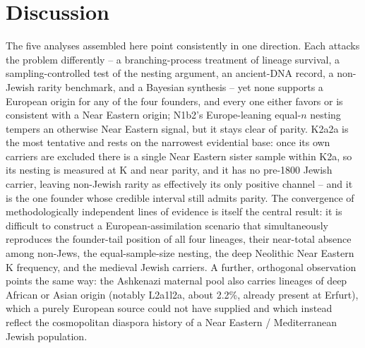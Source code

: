\documentclass[11pt]{article}
\begin{document}
\section{Discussion}
The five analyses assembled here point consistently in one direction. Each attacks the problem differently -- a branching-process treatment of lineage survival, a sampling-controlled test of the nesting argument, an ancient-DNA record, a non-Jewish rarity benchmark, and a Bayesian synthesis -- yet none supports a European origin for any of the four founders, and every one either favors or is consistent with a Near Eastern origin; N1b2's Europe-leaning equal-$n$ nesting tempers an otherwise Near Eastern signal, but it stays clear of parity. K2a2a is the most tentative and rests on the narrowest evidential base: once its own carriers are excluded there is a single Near Eastern sister sample within K2a, so its nesting is measured at K and near parity, and it has no pre-1800 Jewish carrier, leaving non-Jewish rarity as effectively its only positive channel -- and it is the one founder whose credible interval still admits parity. The convergence of methodologically independent lines of evidence is itself the central result: it is difficult to construct a European-assimilation scenario that simultaneously reproduces the founder-tail position of all four lineages, their near-total absence among non-Jews, the equal-sample-size nesting, the deep Neolithic Near Eastern K frequency, and the medieval Jewish carriers. A further, orthogonal observation points the same way: the Ashkenazi maternal pool also carries lineages of deep African or Asian origin (notably L2a1l2a, about 2.2\%, already present at Erfurt), which a purely European source could not have supplied and which instead reflect the cosmopolitan diaspora history of a Near Eastern / Mediterranean Jewish population.
\end{document}
